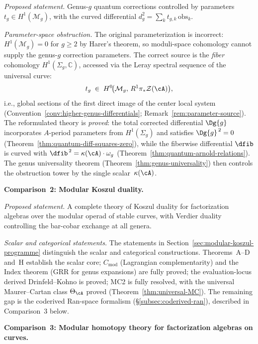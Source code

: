 \emph{Proposed statement.}
Genus-$g$ quantum corrections controlled by parameters
$t_g \in H^1(\mathcal{M}_g)$, with the curved differential
$d_g^2 = \sum_k t_{g,k}\,\mathrm{obs}_k$.

\emph{Parameter-space obstruction.}
The original parameterization is incorrect: $H^1(\mathcal{M}_g) = 0$
for $g \geq 2$ by Harer's theorem, so moduli-space cohomology cannot
supply the genus-$g$ correction parameters.  The correct source is
the \emph{fiber} cohomology $H^1(\Sigma_g, \mathbb{C})$, accessed
via the Leray spectral sequence of the universal curve:
\[
t_g \;\in\; H^0\!\bigl(\mathcal{M}_g,\, R^1\pi_*\mathcal{Z}(\cA)\bigr),
\]
i.e., global sections of the first direct image of the center local
system (Convention~\ref{conv:higher-genus-differentials};
Remark~\ref{rem:parameter-source}).  The reformulated theory is
\emph{proved}: the total corrected differential $\Dg{g}$ incorporates
$A$-period parameters from $H^1(\Sigma_g)$ and satisfies
$\Dg{g}^{\,2} = 0$ (Theorem~\ref{thm:quantum-diff-squares-zero}),
while the fiberwise differential $\dfib$ is curved with
$\dfib^{\,2} = \kappa(\cA)\cdot\omega_g$
(Theorem~\ref{thm:quantum-arnold-relations}).  The genus
universality theorem (Theorem~\ref{thm:genus-universality}) then
controls the obstruction tower by the single scalar~$\kappa(\cA)$.

\medskip

\noindent\textbf{Comparison~2: Modular Koszul duality.}

\emph{Proposed statement.}
A complete theory of Koszul duality for factorization algebras
over the modular operad of stable curves, with Verdier duality
controlling the bar-cobar exchange at all genera.

\emph{Scalar and categorical statements.}
The statements in Section~\ref{sec:modular-koszul-programme}
distinguish the scalar and categorical constructions.  Theorems~A--D and~H establish the
scalar core; $C_{\mathrm{mod}}$ (Lagrangian complementarity) and the
Index theorem (GRR for genus expansions) are fully proved; the
evaluation-locus derived Drinfeld--Kohno is proved; MC2 is
fully resolved, with the universal Maurer--Cartan class
$\Theta_{\cA}$ proved (Theorem~\ref{thm:universal-MC}).
The remaining gap is the coderived Ran-space formalism
(\S\ref{subsec:coderived-ran}), described in Comparison~3 below.

\medskip

\noindent\textbf{Comparison~3: Modular homotopy theory for factorization
algebras on curves.}

